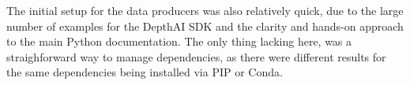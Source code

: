 The initial setup for the data producers was also relatively quick, due to the large number of examples for the DepthAI \ac{SDK} and the clarity and hands-on approach to the main Python documentation. The only thing lacking here, was a straighforward way to manage dependencies, as there were different results for the same dependencies being installed via PIP or Conda.

